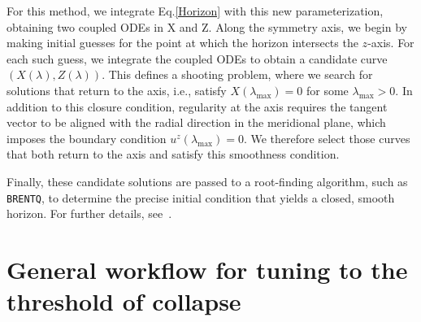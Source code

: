 For this method, we integrate Eq.\ref{Horizon} with this new parameterization, obtaining two coupled ODEs  in X and Z. Along the symmetry axis, we begin by making initial guesses for the point at which the horizon intersects the $z$-axis. For each such guess, we integrate the coupled ODEs to obtain a candidate curve $(X(\lambda), Z(\lambda))$. This defines a shooting problem, where we search for solutions that return to the axis, i.e., satisfy $X(\lambda_{\max}) = 0$ for some $\lambda_{\max} > 0$. In addition to this closure condition, regularity at the axis requires the tangent vector to be aligned with the radial direction in the meridional plane, which imposes the boundary condition $u^z(\lambda_{\max}) = 0$. We therefore select those curves that both return to the axis and satisfy this smoothness condition.

Finally, these candidate solutions are passed to a root-finding algorithm, such as \texttt{BRENTQ}, to determine the precise initial condition that yields a closed, smooth horizon. For further details, see~\cite{khirnov_2022}.

\section*{General workflow for tuning to the threshold of collapse}

